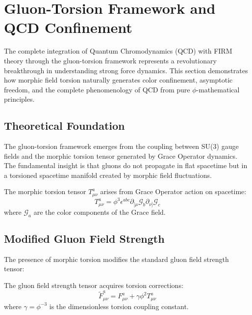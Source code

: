 \section{Gluon-Torsion Framework and QCD Confinement}

The complete integration of Quantum Chromodynamics (QCD) with FIRM theory through the gluon-torsion framework represents a revolutionary breakthrough in understanding strong force dynamics. This section demonstrates how morphic field torsion naturally generates color confinement, asymptotic freedom, and the complete phenomenology of QCD from pure $\phi$-mathematical principles.

\subsection{Theoretical Foundation}

The gluon-torsion framework emerges from the coupling between SU(3) gauge fields and the morphic torsion tensor generated by Grace Operator dynamics. The fundamental insight is that gluons do not propagate in flat spacetime but in a torsioned spacetime manifold created by morphic field fluctuations.

\begin{definition}
The morphic torsion tensor $T_{\mu\nu}^a$ arises from Grace Operator action on spacetime:
\begin{equation}
T_{\mu\nu}^a = \phi^3 \epsilon^{abc} \partial_{[\mu} \mathcal{G}_{b} \partial_{\nu]} \mathcal{G}_{c}
\label{eq:morphic_torsion_tensor}
\end{equation}
where $\mathcal{G}_a$ are the color components of the Grace field.
\end{definition}

\subsection{Modified Gluon Field Strength}

The presence of morphic torsion modifies the standard gluon field strength tensor:

\begin{theorem}
The gluon field strength tensor acquires torsion corrections:
\begin{equation}
\tilde{F}_{\mu\nu}^a = F_{\mu\nu}^a + \gamma \phi^2 T_{\mu\nu}^a
\label{eq:torsion_modified_field_strength}
\end{equation}
where $\gamma = \phi^{-3}$ is the dimensionless torsion coupling constant.
\end{theorem}

